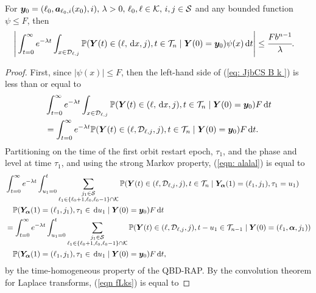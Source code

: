 \begin{cor}\label{vcor: cdks d}
	For \(\boldsymbol y_0=(\ell_0,\boldsymbol a_{\ell_0,i}(x_0),i),\, \lambda>0,\, \ell_0,\ell\in\mathcal K,\,i,j\in\mathcal S\) and any bounded function \(\psi\leq F\), then
	\begin{align}
		\Bigg|&\int_{t=0}^\infty e^{-\lambda t}\int_{x\in\mathcal{D}_{\ell,j}}\mathbb P({\boldsymbol Y}(t) \in (\ell,\, \mathrm{d} x, j), t\in\mathcal T_n \mid 
		\boldsymbol Y(0)=\boldsymbol y_0)
		\psi(x) \, \mathrm{d} t \Bigg|
		\leq \cfrac{F b^{n-1}}{\lambda}.\label{eq: JjbCS  B k }
	\end{align}
\end{cor}
\begin{proof}
	First, since \(|\psi(x)|\leq F\), then the left-hand side of (\ref{eq: JjbCS  B k }) is less than or equal to 
	\begin{align}
		&\int_{t=0}^\infty e^{-\lambda t}\int_{x\in\mathcal{D}_{\ell,j}}\mathbb P({\boldsymbol Y}(t) \in (\ell,\, \mathrm{d} x,j), t\in\mathcal T_n \mid  \nonumber 
		\boldsymbol Y(0)=\boldsymbol y_0)F\, \mathrm{d} t \nonumber
		\\&=\int_{t=0}^\infty e^{-\lambda t} \mathbb P( {\boldsymbol Y}(t) \in (\ell,\mathcal D_{\ell,j},j), t\in\mathcal T_n \mid \boldsymbol Y(0)=\boldsymbol y_0)F\, \mathrm{d} t. \label{eqn: alalal}
	\end{align}
	Partitioning on the time of the first orbit restart epoch, \(\tau_1\), and the phase and level at time \(\tau_1\), and using the strong Markov property, (\ref{eqn: alalal}) is equal to 
	\begin{align}
		&\int_{t=0}^\infty e^{-\lambda t} \int_{u_1=0}^t \sum_{\substack{j_1\in\mathcal S\\\ell_1\in\{\ell_0+1,\ell_0,\ell_0-1\}\cap\mathcal K}}\mathbb P( {\boldsymbol Y}(t) \in (\ell,\mathcal D_{\ell,j},j), t\in\mathcal T_n \nonumber
		\mid \bm{Y}_{\bm{\alpha}}(1)=(\ell_1,j_1),  \tau_1=u_1)\nonumber
		\\&\quad\mathbb P(\bm{Y}_{\bm{\alpha}}(1)=(\ell_1,j_1), \tau_1\in \, \mathrm{d} u_1
		\mid \boldsymbol Y(0)=\boldsymbol y_0)F  \, \mathrm{d} t\nonumber
		\\&=\int_{t=0}^\infty e^{-\lambda t} \int_{u_1=0}^t \sum_{\substack{j_1\in\mathcal S\\\ell_1\in\{\ell_0+1,\ell_0,\ell_0-1\}\cap\mathcal K}}\mathbb P( {\boldsymbol Y}(t) \in (\ell,\mathcal D_{\ell,j},j), t-u_1\in\mathcal T_{n-1} \nonumber
		\mid 
		\boldsymbol Y(0)=(\ell_1,\boldsymbol \alpha,j_1))
		\\&\quad\mathbb P(\bm{Y}_{\bm{\alpha}}(1)=(\ell_1,j_1), \tau_1\in \, \mathrm{d} u_1
		\mid \boldsymbol Y(0)=\boldsymbol y_0)F  \, \mathrm{d} t, \label{eqn fLks}
	\end{align}
	by the time-homogeneous property of the QBD-RAP. By the convolution theorem for Laplace transforms, (\ref{eqn fLks}) is equal to 

\end{proof}
